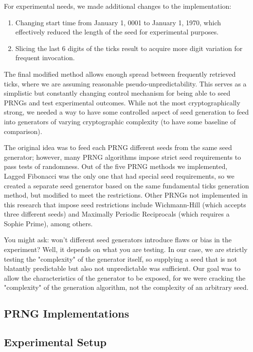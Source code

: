 \documentclass[conference]{IEEEtran}
\begin{document}
For experimental needs, we made additional changes to the implementation:
\begin{enumerate}
    \item Changing start time from January 1, 0001 to January 1, 1970, which effectively reduced the length of the seed for experimental purposes.
    \item Slicing the last 6 digits of the ticks result to acquire more digit variation for frequent invocation.
\end{enumerate}

The final modified method allows enough spread between frequently retrieved ticks, where we are assuming reasonable pseudo-unpredictability. This serves as a simplistic but constantly changing control mechanism for being able to seed PRNGs and test experimental outcomes. While not the most cryptographically strong, we needed a way to have some controlled aspect of seed generation to feed into generators of varying cryptographic complexity (to have some baseline of comparison).

The original idea was to feed each PRNG different seeds from the same seed generator; however, many PRNG algorithms impose strict seed requirements to pass tests of randomness. Out of the five PRNG methods we implemented, Lagged Fibonacci was the only one that had special seed requirements, so we created a separate seed generator based on the same fundamental ticks generation method, but modified to meet the restrictions. Other PRNGs not implemented in this research that impose seed restrictions include Wichmann-Hill (which accepts three different seeds) and Maximally Periodic Reciprocals (which requires a Sophie Prime), among others.

You might ask: won't different seed generators introduce flaws or bias in the experiment? Well, it depends on what you are testing. In our case, we are strictly testing the "complexity" of the generator itself, so supplying a seed that is not blatantly predictable but also not unpredictable was sufficient. Our goal was to allow the characteristics of the generator to be exposed, for we were cracking the "complexity" of the generation algorithm, not the complexity of an arbitrary seed.

\subsection{PRNG Implementations}

\subsection{Experimental Setup}
\end{document}
